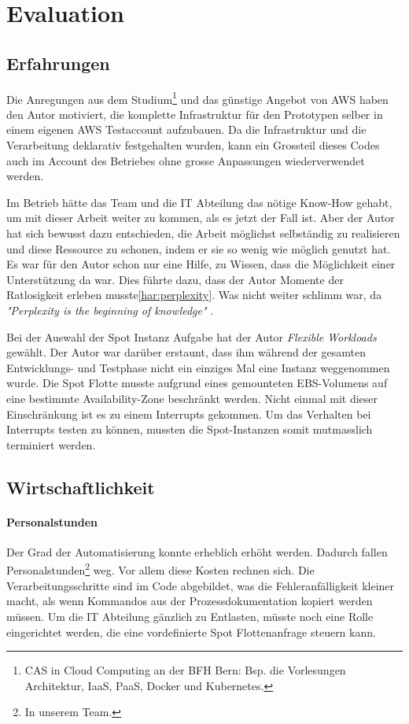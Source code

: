 \section{Evaluation}
\subsection{Erfahrungen}
Die Anregungen aus dem Studium\footnote{CAS in Cloud Computing an der BFH Bern: Bsp. die Vorlesungen Architektur, IaaS, PaaS, Docker und Kubernetes.} und das günstige Angebot von AWS haben den Autor motiviert, die komplette Infrastruktur für den Prototypen selber in einem eigenen AWS Testaccount aufzubauen. Da die Infrastruktur und die Verarbeitung deklarativ festgehalten wurden, kann ein Grossteil dieses Codes auch im Account des Betriebes ohne grosse Anpassungen wiederverwendet werden.

Im Betrieb hätte das Team und die IT Abteilung das nötige Know-How gehabt, um mit dieser Arbeit weiter zu kommen, als es jetzt der Fall ist. Aber der Autor hat sich bewusst dazu entschieden, die Arbeit möglichst selbständig zu realisieren und  diese Ressource zu schonen, indem er sie so wenig wie möglich genutzt hat. Es war für den Autor schon nur eine Hilfe, zu Wissen, dass die Möglichkeit einer Unterstützung da war. Dies führte dazu, dass der Autor Momente der Ratlosigkeit erleben musste\ref{har:perplexity}. Was nicht weiter schlimm war, da \textit{"Perplexity is the beginning of knowledge"} \autocite[33]{CloudNativ:1}.

Bei der Auswahl der Spot Instanz Aufgabe hat der Autor \emph{Flexible Workloads} gewählt. Der Autor war darüber erstaunt, dass ihm während der gesamten Entwicklungs- und Testphase nicht ein einziges Mal eine Instanz weggenommen wurde. Die Spot Flotte musste aufgrund eines gemounteten EBS-Volumens auf eine bestimmte Availability-Zone beschränkt werden. Nicht einmal mit dieser Einschränkung ist es zu einem Interrupts gekommen. Um das Verhalten bei Interrupts testen zu können, mussten die Spot-Instanzen somit mutmasslich terminiert werden.


\subsection{Wirtschaftlichkeit}\label{kap:wirtschaftlichkeit}
\paragraph{Personalstunden}
Der Grad der Automatisierung konnte erheblich erhöht werden. Dadurch fallen Personalstunden\footnote{In unserem Team.} weg. Vor allem diese Kosten rechnen sich. Die Verarbeitungsschritte sind im Code abgebildet, was die Fehleranfälligkeit kleiner macht, als wenn Kommandos aus der Prozessdokumentation kopiert werden müssen. Um die IT Abteilung gänzlich zu Entlasten, müsste noch eine Rolle eingerichtet werden, die eine vordefinierte Spot Flottenanfrage steuern kann.
